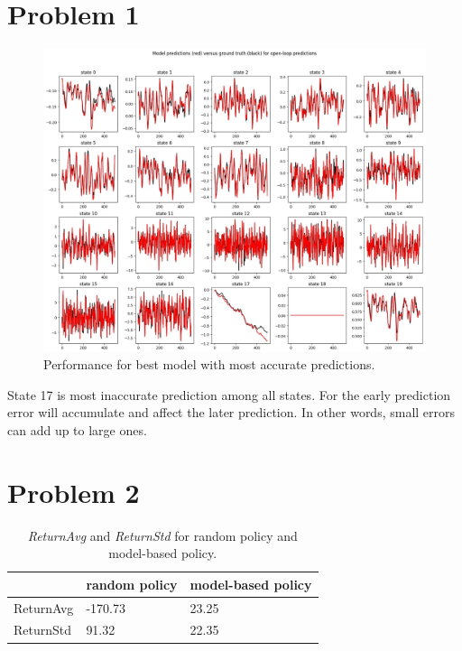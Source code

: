 \documentclass[12pt]{article}
\begin{document}
\pagebreak

\section{Problem 1}
\begin{figure}[!h]
\centering
\includegraphics[width=5in]{Figure_1.jpg}
\caption{Performance for best model with most accurate predictions.}
\end{figure}

State 17 is most inaccurate prediction among all states. For the early prediction error will accumulate and affect the later prediction. In other words, small errors can add up to large ones.

\newpage
\section{Problem 2}

\begin{table}[!h]
\begin{center}
\begin{tabular}{@{}l|l|l@{}}
\toprule
          & random policy & model-based policy \\ \midrule
ReturnAvg & -170.73 & 23.25                 \\
ReturnStd & 91.32   & 22.35                 \\ \bottomrule
\end{tabular}
\caption{{\em ReturnAvg} and {\em ReturnStd} for random policy and model-based policy.}
\end{center}
\end{table}
\end{document}
